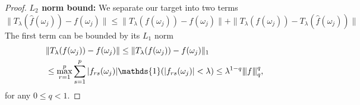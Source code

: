 \begin{proof}
\noindent \textbf{$L_2$ norm bound: } We separate our target into two terms 
\begin{equation}
\|T_\lambda(\hat{f}(\omega_j))-f(\omega_j)\| \le \|T_\lambda(f(\omega_j))-f(\omega_j)\|+\|T_\lambda(f(\omega_j))-T_\lambda(\hat{f}(\omega_j))\| \nonumber
\end{equation}
The first term can be bounded by its $L_1$ norm 
\begin{equation}
\label{eq:two_parts_L2_norm}
\begin{aligned}
& \|T_\lambda(f(\omega_j))-f(\omega_j)\|\le \|T_\lambda(f(\omega_j))-f(\omega_j)\|_1\\
& \le \max_{r=1}^p \sum_{s=1}^p |f_{rs}(\omega_j)|\mathds{1}(|f_{rs}(\omega_j)|<\lambda) \le  \lambda^{1-q}\vertiii{f}_q^q,
\end{aligned}
\end{equation}
for any $0\le q<1$. 


\end{proof}
